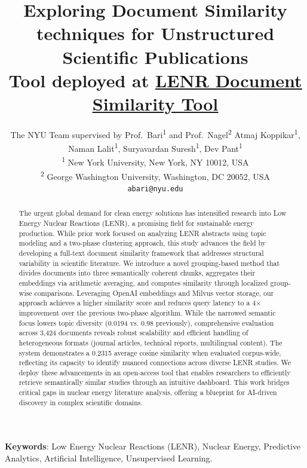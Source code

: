 \documentclass[12pt]{article}
\title{\textbf{Exploring Document Similarity techniques for Unstructured Scientific Publications}\\
\large Tool deployed at \underline{\href{http://150.230.235.239:12345/}{LENR Document Similarity Tool}}}
\author{
  The NYU Team supervised by Prof.\ Bari\textsuperscript{1} and Prof.\ Nagel\textsuperscript{2}
  Atmaj Koppikar\textsuperscript{1},
  Naman Lalit\textsuperscript{1}, 
  Suryavardan Suresh\textsuperscript{1}, 
  Dev Pant\textsuperscript{1}\\
  \textsuperscript{1} New York University, New York, NY 10012, USA\\
  \textsuperscript{2} George Washington University, Washington, DC 20052, USA\\
  \texttt{abari@nyu.edu}
}
\date{}
\begin{document}
\maketitle

\begin{abstract}
    The urgent global demand for clean energy solutions has intensified research into Low Energy Nuclear Reactions (LENR), a promising field for sustainable energy production.
     While prior work focused on analyzing LENR abstracts using topic modeling and a two-phase clustering approach, this study advances the field by developing a full-text document similarity framework that addresses structural variability in scientific literature. 
     We introduce a novel grouping-based method that divides documents into three semantically coherent chunks, aggregates their embeddings via arithmetic averaging, and computes similarity through localized group-wise comparisons. 
     Leveraging OpenAI embeddings and Milvus vector storage, our approach achieves a higher similarity score and reduces query latency to a 4× improvement over the previous two-phase algorithm. 
     While the narrowed semantic focus lowers topic diversity (0.0194 vs. 0.98 previously), comprehensive evaluation across 3,424 documents reveals robust scalability and efficient handling of heterogeneous formats (journal articles, technical reports, multilingual content). The system demonstrates a 0.2315 average cosine similarity when evaluated corpus-wide, reflecting its capacity to identify nuanced connections across diverse LENR studies. 
     We deploy these advancements in an open-access tool that enables researchers to efficiently retrieve semantically similar studies through an intuitive dashboard.
     This work bridges critical gaps in nuclear energy literature analysis, offering a blueprint for AI-driven discovery in complex scientific domains.
\end{abstract}

\textbf{Keywords}: Low Energy Nuclear Reactions (LENR), Nuclear Energy, Predictive Analytics, Artificial Intelligence, Unsupervised Learning.
\end{document}

